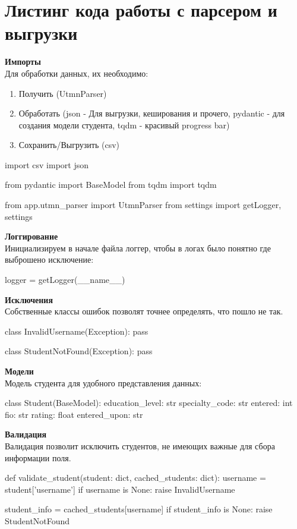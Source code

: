 \documentclass[a4paper,12pt]{article} %
\begin{document}
\section{Листинг кода работы с парсером и выгрузки}

\textbf{Импорты}\\
Для обработки данных, их необходимо:
\begin{enumerate}
    \item Получить (UtmnParser)
    \item Обработать (json - Для выгрузки, кеширования и прочего, pydantic - для создания модели студента, tqdm - красивый progress bar)
    \item Сохранить/Выгрузить (csv)
\end{enumerate}

\begin{python}
import csv
import json

from pydantic import BaseModel
from tqdm import tqdm

from app.utmn_parser import UtmnParser
from settings import getLogger, settings
\end{python}

\textbf{Логгирование} \\
Инициализируем в начале файла логгер, чтобы в логах было понятно где выброшено исключение:
\begin{python}
logger = getLogger(__name__)
\end{python}

\textbf{Исключения} \\
Собственные классы ошибок позволят точнее определять, что пошло не так. 
\begin{python}
class InvalidUsername(Exception):
    pass


class StudentNotFound(Exception):
    pass
\end{python}


\textbf{Модели} \\
Модель студента для удобного представления данных:
\begin{python}
class Student(BaseModel):
    education_level: str
    specialty_code: str
    entered: int
    fio: str
    rating: float
    entered_upon: str
\end{python}


\textbf{Валидация} \\
Валидация позволит исключить студентов, не имеющих важные для сбора информации поля.
\begin{python}
def validate_student(student: dict, cached_students: dict):
    username = student['username']
    if username is None:
        raise InvalidUsername

    student_info = cached_students[username]
    if student_info is None:
        raise StudentNotFound
\end{python}
\end{document}
